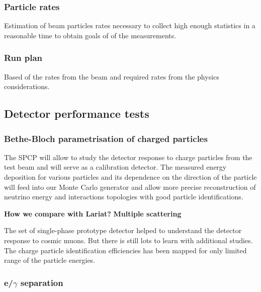 \clearpage
\subsubsection{Particle rates}
Estimation of  beam particles rates  necessary to collect high enough statistics in a reasonable time to obtain goals of of the measurements.
\subsubsection {Run plan}
Based of the rates from the beam and required rates from the physics considerations.



\subsection{Detector performance tests}

\subsubsection{Bethe-Bloch parametrisation of charged particles}

The SPCP will allow to study the detector response to charge particles from the test beam and will serve as a calibration detector. The measured energy deposition for various particles and its dependence on the direction of the particle will feed into our Monte Carlo generator and allow more precise reconstruction of neutrino energy and interactions topologies with good particle identifications.
 
{\bf How we compare with Lariat?} 
{\bf Multiple scattering}  

The set of single-phase prototype detector helped to understand the detector response to cosmic muons. But there is still lots to learn with additional studies. 
The charge  particle identification efficiencies  has been mapped for only limited range of the particle energies.  

\subsubsection{e/$\gamma$ separation}

